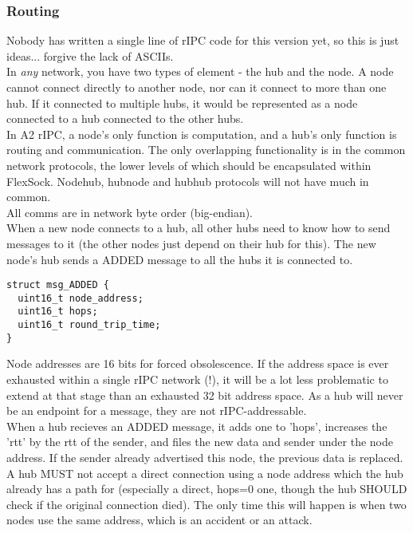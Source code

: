 \documentclass[a4paper,oneside,openany]{book}
\begin{document}
\subsubsection{Routing}
Nobody has written a single line of rIPC code for this version yet, so this
is just ideas... forgive the lack of ASCIIs.\smallskip\\
In \emph{any} network, you have two types of element - the hub and the node.
A node cannot connect directly to another node, nor can it connect to more
than one hub. If it connected to multiple hubs, it would be represented as a
node connected to a hub connected to the other hubs.\smallskip\\
In A2 rIPC, a node's only function is computation, and a hub's only function
is routing and communication. The only overlapping functionality is in the
common network protocols, the lower levels of which should be encapsulated
within FlexSock. Node\rarrow{}hub, hub\rarrow{}node and hub\rarrow{}hub protocols
will not have much in common.\smallskip\\
All comms are in network byte order (big-endian).\smallskip\\
When a new node connects to a hub, all other hubs need to know how to send
messages to it (the other nodes just depend on their hub for this). The new node's
hub sends a ADDED message to all the hubs it is connected to.
\begin{verbatim}
struct msg_ADDED {
  uint16_t node_address;
  uint16_t hops;
  uint16_t round_trip_time;
}
\end{verbatim}
Node addresses are 16 bits for forced obsolescence. If the address space is ever
exhausted within a single rIPC network (!), it will be a lot less problematic to
extend at that stage than an exhausted 32 bit address space. As a hub will never
be an endpoint for a message, they are not rIPC-addressable.\smallskip\\
When a hub recieves an ADDED message, it adds one to 'hops', increases the 'rtt'
by the rtt of the sender, and files the new data and sender under the node address.
If the sender already advertised this node, the previous data is replaced.\smallskip\\
A hub MUST not accept a direct connection using a node address which the hub
already has a path for (especially a direct, hops=0 one, though the hub SHOULD
check if the original connection died). The only time this will happen is when
two nodes use the same address, which is an accident or an attack.\smallskip\\
\end{document}
